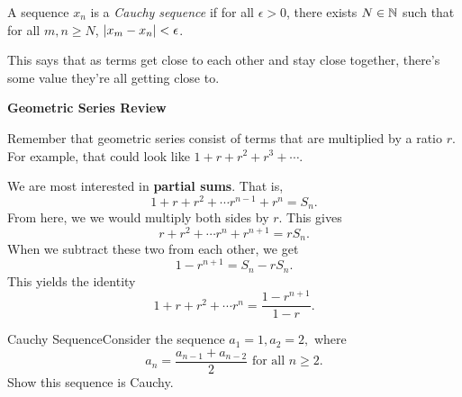 \begin{definition}
    A sequence \(x_n\) is a \textit{Cauchy sequence} if for all \(\epsilon > 0\), there exists \(N \in \mathbb{N}\) such that for all \(m,n \geq N\), \(\left|x_m - x_n\right| < \epsilon\).
\end{definition}

This says that as terms get close to each other and stay close together, there's some value they're all getting close to.

\begin{center}
    \textbf{Geometric Series Review}
\end{center}

Remember that geometric series consist of terms that are multiplied by a ratio \(r\). For example, that could look like \(1 + r + r^{2} + r^{3} + \cdots\).

We are most interested in \textbf{partial sums}. That is,
\[
    1 + r + r^{2} + \cdots r^{n - 1} + r^{n} = S_{n}.
\]
From here, we we would multiply both sides by \(r\). This gives
\[
    r + r^{2} + \cdots r^{n} + r^{n + 1} = rS_{n}.
\]
When we subtract these two from each other, we get
\[
    1 - r^{n + 1} = S_{n} - rS_{n}.
\]
This yields the identity
\[
    1 + r + r^{2} + \cdots r^{n} = \frac{1-r^{n + 1}}{1 - r}.
\]

\begin{example}
    {Cauchy Sequence}Consider the sequence \(a_1 = 1, a_2 = 2,\) where \[a_n = \frac{a_{n-1} + a_{n-2}}{2} \text{ for all } n \geq 2.\] Show this sequence is Cauchy.
\end{example}

